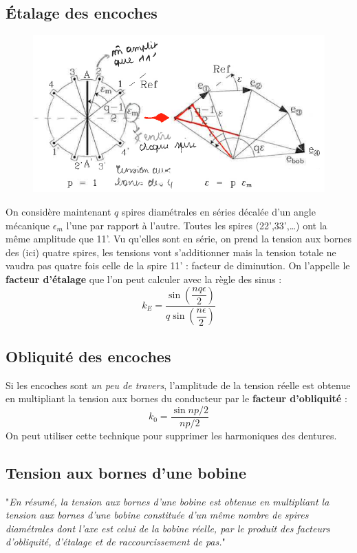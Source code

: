 	\subsection{Étalage des encoches}
	\begin{figure}
	\vspace{-8mm}
	\includegraphics[scale=0.38]{ch5/image8.png}
	\end{figure}
	On considère maintenant $q$ spires diamétrales en séries décalée d'un angle mécanique
	$\epsilon_m$ l'une par rapport à l'autre. Toutes les spires (22',33',\dots) ont la 
	même amplitude que 11'. Vu qu'elles sont en série, on prend la tension aux bornes des 
	(ici) quatre spires, les tensions vont s'additionner mais la tension totale ne vaudra 
	pas quatre fois celle de la spire 11' : facteur de diminution. On l'appelle le 
	\textbf{facteur d'étalage} que l'on peut calculer avec la règle des sinus :
	\begin{equation}
	k_E = \dfrac{\sin\left(\dfrac{nq\epsilon}{2}\right)}{q\sin\left(\dfrac{n\epsilon}{2}
	\right)}
	\end{equation}
	
	\subsection{Obliquité des encoches}
	Si les encoches sont \textit{un peu de travers}, l'amplitude de la tension réelle 
	est obtenue en multipliant la tension aux bornes du conducteur par le \textbf{facteur 
	d'obliquité }:
	\begin{equation}
	k_0 = \dfrac{\sin np/2}{np/2}
	\end{equation}
	On peut utiliser cette technique pour supprimer les harmoniques des dentures.
	
	\subsection{Tension aux bornes d'une bobine}
	"\textit{En résumé, la tension aux bornes d'une bobine est obtenue en multipliant la 
	tension aux bornes d'une bobine constituée d'un même nombre de spires diamétrales dont 
	l'axe est celui de la bobine réelle, par le produit des facteurs d'obliquité, d'étalage 
	et de raccourcissement de pas.}"
	
